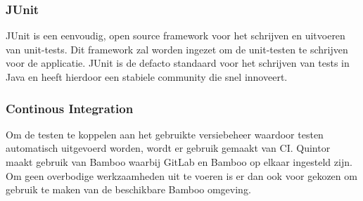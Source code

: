 \subsubsection{JUnit}
JUnit is een eenvoudig, open source framework voor het schrijven en uitvoeren van unit-tests. Dit framework zal worden ingezet om de unit-testen te schrijven voor de applicatie. JUnit is de defacto standaard voor het schrijven van tests in Java en heeft hierdoor een stabiele community die snel innoveert. 

\subsubsection{Continous Integration}

Om de testen te koppelen aan het gebruikte versiebeheer waardoor testen automatisch uitgevoerd worden, wordt er gebruik gemaakt van \acrfull{CI}. Quintor maakt gebruik van Bamboo waarbij GitLab en Bamboo op elkaar ingesteld zijn. Om geen overbodige werkzaamheden uit te voeren is er dan ook voor gekozen om gebruik te maken van de beschikbare Bamboo omgeving.

